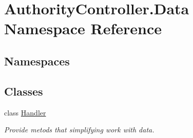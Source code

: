 \hypertarget{namespace_authority_controller_1_1_data}{}\section{Authority\+Controller.\+Data Namespace Reference}
\label{namespace_authority_controller_1_1_data}
\subsection*{Namespaces}
\begin{DoxyCompactItemize}
\end{DoxyCompactItemize}
\subsection*{Classes}
\begin{DoxyCompactItemize}
\item 
class \mbox{\hyperlink{class_authority_controller_1_1_data_1_1_handler}{Handler}}
\begin{DoxyCompactList}\small\item\em Provide metods that simplifying work with data. \end{DoxyCompactList}\end{DoxyCompactItemize}
